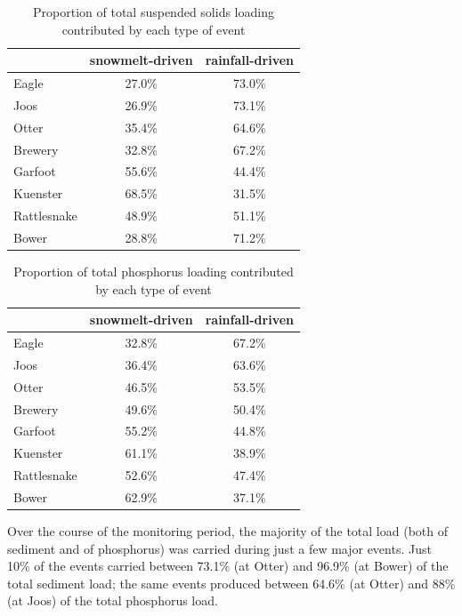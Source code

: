 \documentclass[12pt]{article}
\begin{document}
\begin{table}[ht]
\begin{center}
\begin{tabular}{lcc}
  & snowmelt-driven & rainfall-driven \\ 
  \hline
Eagle & 27.0\% & 73.0\% \\ 
  Joos & 26.9\% & 73.1\% \\ 
  Otter & 35.4\% & 64.6\% \\ 
  Brewery & 32.8\% & 67.2\% \\ 
  Garfoot & 55.6\% & 44.4\% \\ 
  Kuenster & 68.5\% & 31.5\% \\ 
  Rattlesnake & 48.9\% & 51.1\% \\ 
  Bower & 28.8\% & 71.2\% \\ 
  \end{tabular}
\caption{Proportion of total suspended solids loading contributed by each type of event}
\label{tab:stot}
\end{center}
\end{table}
\begin{table}[ht]
\begin{center}
\begin{tabular}{lcc}
  & snowmelt-driven & rainfall-driven \\ 
  \hline
Eagle & 32.8\% & 67.2\% \\ 
  Joos & 36.4\% & 63.6\% \\ 
  Otter & 46.5\% & 53.5\% \\ 
  Brewery & 49.6\% & 50.4\% \\ 
  Garfoot & 55.2\% & 44.8\% \\ 
  Kuenster & 61.1\% & 38.9\% \\ 
  Rattlesnake & 52.6\% & 47.4\% \\ 
  Bower & 62.9\% & 37.1\% \\ 
  \end{tabular}
\caption{Proportion of total phosphorus loading contributed by each type of event}
\label{tab:ptot}
\end{center}
\end{table}
Over the course of the monitoring period, the majority of the total load (both of sediment and of phosphorus) was carried during just a few major events. Just 10\% of the events carried between 73.1\% (at Otter) and 96.9\% (at Bower) of the total sediment load; the same events produced between 64.6\% (at Otter) and 88\% (at Joos) of the total phosphorus load.\\
\end{document}
